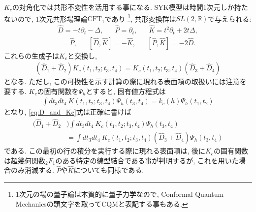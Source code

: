 $K_c$の対角化では共形不変性を活用する事になる. 
SYK模型は時間1次元しか持たないので, 1次元共形場理論$\mathrm{CFT}_1$であり
\footnote{1次元の場の量子論は本質的に量子力学なので, 
Conformal Quantum Mechanicsの頭文字を取ってCQMと表記する事もある. }, 
共形変換群は$SL(2, \mathbb{R})$で与えられる\cite{andrzejewski}:
\begin{align}
	\hat{D} = -t\partial_t - \Delta,\hspace{20pt}
	\hat{P} = \partial_t,\hspace{20pt}
	\hat{K} = t^2\partial_t + 2t\Delta,
\end{align}
\begin{align}
	[\hat{D}, \hat{P}] = \hat{P},\hspace{20pt}
	[\hat{D}, \hat{K}] = -\hat{K},\hspace{20pt}
	[\hat{P}, \hat{K}] = -2\hat{D}.
\end{align}
これらの生成子は$K_c$と交換し, 
\begin{align}
	(\hat{D}_1 + \hat{D}_2)K_c(t_1, t_2; t_3, t_4)
	= K_c(t_1, t_2; t_3, t_4)(\hat{D}_3 + \hat{D}_4)
	\label{eq:D_and_Kc}
\end{align}
となる. 
ただし, この可換性を示す計算の際に現れる表面項の取扱いには注意を要する. 
$K_c$の固有関数を$\Psi_h$とすると, 固有値方程式は
\begin{align}
	\int dt_3dt_4\  K(t_1, t_2; t_3, t_4)\Psi_h(t_3, t_4)
	= k_c(h)\Psi_h(t_1, t_2)
	\label{eq:eigen_eq_of_Kc}
\end{align}
となり, \eqref{eq:D_and_Kc}式は正確に書けば
\begin{align}
	(\hat{D}_1 + \hat{D}_2 &)\int dt_3dt_4\ K_c(t_1, t_2; t_3, t_4) \Psi_h(t_3, t_4)\nonumber\\
	&= \int dt_3dt_4\ K_c(t_1, t_2; t_3, t_4) (\hat{D}_3 + \hat{D}_4)\Psi_h(t_3, t_4)
\end{align}
である. この最初の行の積分を実行する際に現れる表面項は, 
後に$K_c$の固有関数は超幾何関数${}_2F_1$のある特定の線型結合である事が判明するが, 
これを用いた場合のみ消滅する. 
$\hat{P}$や$\hat{K}$についても同様である. 

